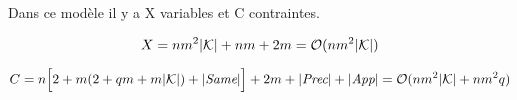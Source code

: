 Dans ce modèle il y a X variables et C contraintes. 

$$
X = nm^2|\mathcal{K}| + nm + 2m= \mathcal{O}(nm^2|\mathcal{K}|)
$$ 





$$ 
C = n\Big{[}2 + m(2 + qm + m|\mathcal{K}|) + |\textit{Same}| \Big{]} + 2m + |\textit{Prec}| +|\textit{App}| = \mathcal{O}(nm^2|\mathcal{K}|+nm^2q)
$$ 


















